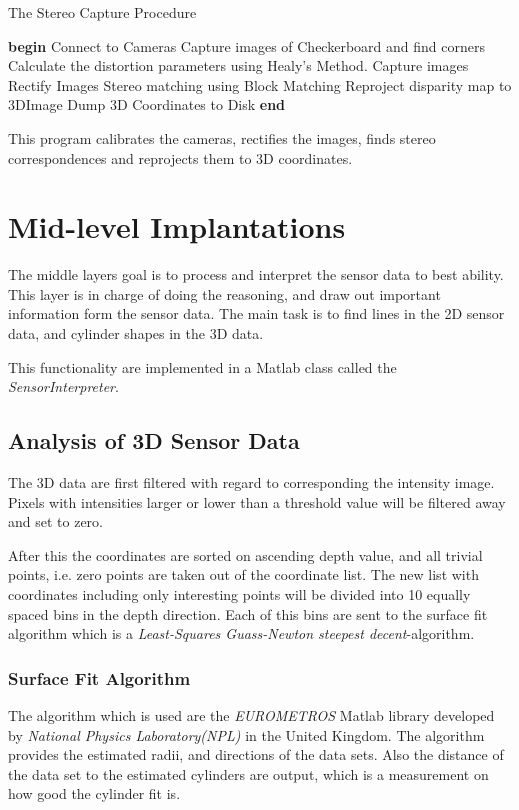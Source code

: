 \begin{algorithm}
\caption{The Stereo Capture Procedure}
\label{chap6:alg-stereomatch}
    \begin{algorithmic}
    \STATE \textbf{begin}
    \STATE Connect to Cameras
        \STATE Capture images of Checkerboard and find corners
    \ENDFOR
    \STATE Calculate the distortion parameters using Healy's Method.
        \STATE Capture images
        \STATE Rectify Images
        \STATE Stereo matching using Block Matching 
        \STATE Reproject disparity map to 3DImage
        \STATE Dump 3D Coordinates to Disk
    \ENDWHILE
    \STATE \textbf{end}
    \end{algorithmic}
\end{algorithm}
This program calibrates the cameras, rectifies the images, finds stereo correspondences
and reprojects them to 3D coordinates.


\section{Mid-level Implantations}
The middle layers goal is to process and interpret the sensor data to best ability. This
layer is in charge of doing the reasoning, and draw out important information form the
sensor data. The main task is to find lines in the 2D sensor data, and cylinder shapes in
the 3D data. 

This functionality are implemented in a Matlab class called the \emph{SensorInterpreter}.


\subsection{Analysis of 3D Sensor Data}
The 3D data are first filtered with regard to corresponding the intensity image. Pixels
with intensities larger or lower than a threshold value will be filtered away and set to
zero. 

After this the coordinates are sorted on ascending depth value, and all trivial points,
i.e. zero points are taken out of the coordinate list. The new list with coordinates
including only interesting points will be divided into 10 equally spaced bins in the depth
direction. Each of this bins are sent to the surface fit algorithm which is a
\emph{Least-Squares Guass-Newton steepest decent}-algorithm. 

\subsubsection{Surface Fit Algorithm}
The algorithm which is used are the \emph{EUROMETROS}\cite{eurometros} Matlab library developed by
\emph{National Physics Laboratory(NPL)} in the United Kingdom. The algorithm provides the
estimated radii, and directions of the data sets. Also the distance of the data set to the
estimated cylinders are output, which is a measurement on how good the cylinder fit is. 


